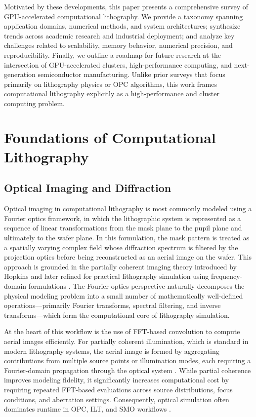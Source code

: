 \documentclass[pdflatex,sn-mathphys-num]{sn-jnl}%
\theoremstyle{thmstyleone}%
\theoremstyle{thmstyletwo}%
\theoremstyle{thmstylethree}%
\begin{document}
Motivated by these developments, this paper presents a comprehensive survey of GPU-accelerated computational lithography. We provide a taxonomy spanning application domains, numerical methods, and system architectures; synthesize trends across academic research and industrial deployment; and analyze key challenges related to scalability, memory behavior, numerical precision, and reproducibility. Finally, we outline a roadmap for future research at the intersection of GPU-accelerated clusters, high-performance computing, and next-generation semiconductor manufacturing. Unlike prior surveys that focus primarily on lithography physics or OPC algorithms, this work frames computational lithography explicitly as a high-performance and cluster computing problem.

\section{Foundations of Computational Lithography}
\subsection{Optical Imaging and Diffraction}
Optical imaging in computational lithography is most commonly modeled using a Fourier optics framework, in which the lithographic system is represented as a sequence of linear transformations from the mask plane to the pupil plane and ultimately to the wafer plane. In this formulation, the mask pattern is treated as a spatially varying complex field whose diffraction spectrum is filtered by the projection optics before being reconstructed as an aerial image on the wafer. This approach is grounded in the partially coherent imaging theory introduced by Hopkins and later refined for practical lithography simulation using frequency-domain formulations \cite{Hopkins88,Mack2007FundamentalPO}. The Fourier optics perspective naturally decomposes the physical modeling problem into a small number of mathematically well-defined operations—primarily Fourier transforms, spectral filtering, and inverse transforms—which form the computational core of lithography simulation.

At the heart of this workflow is the use of FFT-based convolution to compute aerial images efficiently. For partially coherent illumination, which is standard in modern lithography systems, the aerial image is formed by aggregating contributions from multiple source points or illumination modes, each requiring a Fourier-domain propagation through the optical system \cite{Mack2007FundamentalPO,Wong2001ResolutionET}. While partial coherence improves modeling fidelity, it significantly increases computational cost by requiring repeated FFT-based evaluations across source distributions, focus conditions, and aberration settings. Consequently, optical simulation often dominates runtime in OPC, ILT, and SMO workflows \cite{Wong2001ResolutionET,capodieci2006optical}.
\end{document}
